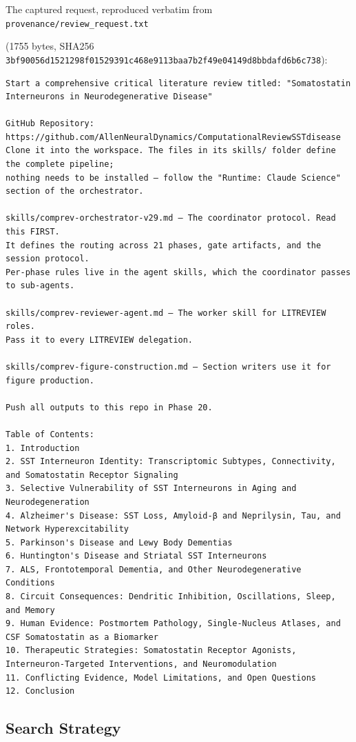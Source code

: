 \documentclass[11pt]{article}
\begin{document}
The captured request, reproduced verbatim from \texttt{provenance/review\_request.txt}

(1755 bytes, SHA256 \texttt{3bf90056d1521298f01529391c468e9113baa7b2f49e04149d8bbdafd6b6c738}):

\begin{Verbatim}[breaklines,breakanywhere]
Start a comprehensive critical literature review titled: "Somatostatin Interneurons in Neurodegenerative Disease"

GitHub Repository: https://github.com/AllenNeuralDynamics/ComputationalReviewSSTdisease
Clone it into the workspace. The files in its skills/ folder define the complete pipeline;
nothing needs to be installed — follow the "Runtime: Claude Science" section of the orchestrator.

skills/comprev-orchestrator-v29.md — The coordinator protocol. Read this FIRST.
It defines the routing across 21 phases, gate artifacts, and the session protocol.
Per-phase rules live in the agent skills, which the coordinator passes to sub-agents.

skills/comprev-reviewer-agent.md — The worker skill for LITREVIEW roles.
Pass it to every LITREVIEW delegation.

skills/comprev-figure-construction.md — Section writers use it for figure production.

Push all outputs to this repo in Phase 20.

Table of Contents:
1. Introduction
2. SST Interneuron Identity: Transcriptomic Subtypes, Connectivity, and Somatostatin Receptor Signaling
3. Selective Vulnerability of SST Interneurons in Aging and Neurodegeneration
4. Alzheimer's Disease: SST Loss, Amyloid-β and Neprilysin, Tau, and Network Hyperexcitability
5. Parkinson's Disease and Lewy Body Dementias
6. Huntington's Disease and Striatal SST Interneurons
7. ALS, Frontotemporal Dementia, and Other Neurodegenerative Conditions
8. Circuit Consequences: Dendritic Inhibition, Oscillations, Sleep, and Memory
9. Human Evidence: Postmortem Pathology, Single-Nucleus Atlases, and CSF Somatostatin as a Biomarker
10. Therapeutic Strategies: Somatostatin Receptor Agonists, Interneuron-Targeted Interventions, and Neuromodulation
11. Conflicting Evidence, Model Limitations, and Open Questions
12. Conclusion
\end{Verbatim}

\subsection{Search Strategy}
\label{sec-methods-search}
\end{document}
